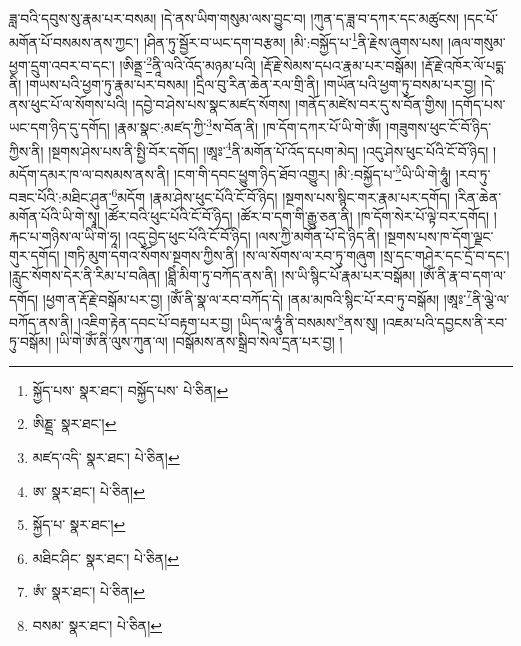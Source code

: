 ཟླ་བའི་དབུས་སུ་རྣམ་པར་བསམ། །དེ་ནས་ཡིག་གསུམ་ལས་བྱུང་བ། །ཀུན་ད་ཟླ་བ་དཀར་དང་མཚུངས། །དང་པོ་མགོན་པོ་བསམས་ནས་ཀྱང་། །ཤིན་ཏུ་སྦྱོར་བ་ཡང་དག་བརྩམ། །མི་:བསྐྱོད་པ་\footnote{སྐྱོད་པས་  སྣར་ཐང་། བསྐྱོད་པས་  པེ་ཅིན། }ནི་རྗེས་ཞུགས་པས། །ཞལ་གསུམ་ཕྱག་དྲུག་འབར་བ་དང་། །ཨིནྡྲ་\footnote{ཨིཎྡྲ་  སྣར་ཐང་། }ནཱི་ལའི་འོད་མཉམ་པའི། །རྡོ་རྗེ་སེམས་དཔའ་རྣམ་པར་བསྒོམ། །རྡོ་རྗེ་འཁོར་ལོ་པདྨ་ནི། །གཡས་པའི་ཕྱག་ཏུ་རྣམ་པར་བསམ། །དྲིལ་བུ་རིན་ཆེན་རལ་གྲི་ནི། །གཡོན་པའི་ཕྱག་ཏུ་བསམ་པར་བྱ། །དེ་ནས་ཕུང་པོ་ལ་སོགས་པའི། །དབྱེ་བ་ཤེས་པས་སྣང་མཛད་སོགས། །གནོད་མཛེས་བར་དུ་ས་བོན་གྱིས། །དགོད་པས་ཡང་དག་ཉིད་དུ་དགོད། །རྣམ་སྣང་:མཛད་ཀྱི་\footnote{མཛད་འདི་  སྣར་ཐང་།  པེ་ཅིན། }ས་བོན་ནི། །ཁ་དོག་དཀར་པོ་ཡི་གེ་ཨོཾ། །གཟུགས་ཕུང་ངོ་བོ་ཉིད་ཀྱིས་ནི། །སྔགས་ཤེས་པས་ནི་སྤྱི་བོར་དགོད། །ཨཱཿ་\footnote{ཨ་  སྣར་ཐང་།  པེ་ཅིན། }ནི་མགོན་པོ་འོད་དཔག་མེད། །འདུ་ཤེས་ཕུང་པོའི་ངོ་བོ་ཉིད། །མདོག་དམར་ཁ་ལ་བསམས་ནས་ནི། །ངག་གི་དབང་ཕྱུག་ཉིད་ཐོབ་འགྱུར། །མི་:བསྐྱོད་པ་\footnote{སྐྱོད་པ་  སྣར་ཐང་། }ཡི་ཡི་གེ་ཧཱུཾ། །རབ་ཏུ་བཟང་པོའི་:མཐིང་ཤུན་\footnote{མཐིང་ཤིང་  སྣར་ཐང་།  པེ་ཅིན། }མདོག །རྣམ་ཤེས་ཕུང་པོའི་ངོ་བོ་ཉིད། །སྔགས་པས་སྙིང་གར་རྣམ་པར་དགོད། །རིན་ཆེན་མགོན་པོའི་ཡི་གེ་སྭཱ། །ཚོར་བའི་ཕུང་པོའི་ངོ་བོ་ཉིད། །ཚོར་བ་དག་གི་རྒྱུ་ཅན་ནི། །ཁ་དོག་སེར་པོ་ལྟེ་བར་དགོད། །རྐང་པ་གཉིས་ལ་ཡི་གེ་ཧཱ། །འདུ་བྱེད་ཕུང་པོའི་ངོ་བོ་ཉིད། །ལས་ཀྱི་མགོན་པོ་དེ་ཉིད་ནི། །སྔགས་པས་ཁ་དོག་ལྗང་གུར་དགོད། །གཏི་མུག་དགའ་སོགས་སྔགས་ཀྱིས་ནི། །ས་ལ་སོགས་ལ་རབ་ཏུ་གཞུག །སྲ་དང་གཤེར་དང་དྲོ་བ་དང་། །རླུང་སོགས་དེར་ནི་རིམ་པ་བཞིན། །ཐླིཾ་མིག་ཏུ་བཀོད་ནས་ནི། །ས་ཡི་སྙིང་པོ་རྣམ་པར་བསྒོམ། །ཨོཾ་ནི་རྣ་བ་དག་ལ་དགོད། །ཕྱག་ན་རྡོ་རྗེ་བསྒོམ་པར་བྱ། །ཨོཾ་ནི་སྣ་ལ་རབ་བཀོད་དེ། །ནམ་མཁའི་སྙིང་པོ་རབ་ཏུ་བསྒོམ། །ཨཱཿ་\footnote{ཨཾ་  སྣར་ཐང་།  པེ་ཅིན། }ནི་ལྕེ་ལ་བཀོད་ནས་ནི། །འཇིག་རྟེན་དབང་པོ་བརྟག་པར་བྱ། །ཡིད་ལ་ཧཱུཾ་ནི་བསམས་\footnote{བསམ་  སྣར་ཐང་།  པེ་ཅིན། }ནས་སུ། །འཇམ་པའི་དབྱངས་ནི་རབ་ཏུ་བསྒོམ། །ཡི་གེ་ཨོཾ་ནི་ལུས་ཀུན་ལ། །བསྒོམས་ནས་སྒྲིབ་སེལ་དྲན་པར་བྱ། །
